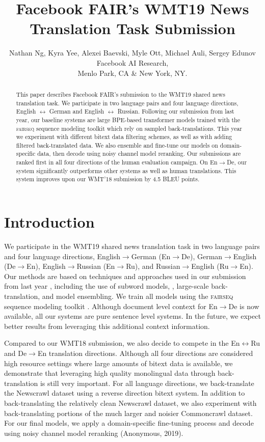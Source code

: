 \documentclass[11pt,a4paper]{article}
\title{Facebook FAIR's WMT19 News Translation Task Submission}
\author{Nathan Ng, Kyra Yee, Alexei Baevski, Myle Ott, Michael Auli, Sergey Edunov \\
Facebook AI Research, \\Menlo Park, CA \& New York, NY.}
\date{}
\newcommand{\fairseq}{\textsc{fairseq}}
\newcommand{\entode}{En$\rightarrow$De}
\newcommand{\detoen}{De$\rightarrow$En}
\newcommand{\entoru}{En$\rightarrow$Ru}
\newcommand{\rutoen}{Ru$\rightarrow$En}
\newcommand{\enbiru}{En$\leftrightarrow$Ru}
\begin{document}
\maketitle
\begin{abstract}
This paper describes Facebook FAIR's submission to the WMT19 shared news translation task.
We participate in two language pairs and four language directions, English $\leftrightarrow$ German and English $\leftrightarrow$ Russian.
Following our submission from last year, our baseline systems are large BPE-based transformer models trained with the \fairseq{} sequence modeling toolkit which rely on sampled back-translations.
This year we experiment with different bitext data filtering schemes, as well as with adding filtered back-translated data.
We also ensemble and fine-tune our models on domain-specific data, then decode using noisy channel model reranking.
Our submissions are ranked first in all four directions of the human evaluation campaign. 
On \entode{}, our system significantly outperforms other systems as well as human translations. 
This system improves upon our WMT'18 submission by 4.5 BLEU points. \end{abstract}

\section{Introduction}
We participate in the WMT19 shared news translation task in two language pairs and four language directions, English$\rightarrow$German (\entode{}), German$\rightarrow$English (\detoen{}), English$\rightarrow$Russian (\entoru{}), and Russian$\rightarrow$English (\rutoen{}). 
Our methods are based on techniques and approaches used in our submission from last year \cite{edunov2018understanding}, including the use of subword models, \cite{sennrich2016neural}, large-scale back-translation, and model ensembling.
We train all models using the \fairseq{} sequence modeling toolkit \cite{ott2019fairseq}. 
Although document level context for \entode{} is now available,  all our systems are pure sentence level systems.
In the future, we expect better results from leveraging this additional context information.

Compared to our WMT18 submission, we also decide to compete in the \enbiru{} and \detoen{} translation directions. 
Although all four directions are considered high resource settings where large amounts of bitext data is available, we demonstrate that leveraging high quality monolingual data through back-translation is still very important. 
For all language directions, we back-translate the Newscrawl dataset using a reverse direction bitext system.
In addition to back-translating the relatively clean Newscrawl dataset, we also experiment with back-translating portions of the much larger and noisier Commoncrawl dataset.
For our final models, we apply a domain-specific fine-tuning process and decode using noisy channel model reranking (Anonymous, 2019).
\end{document}
